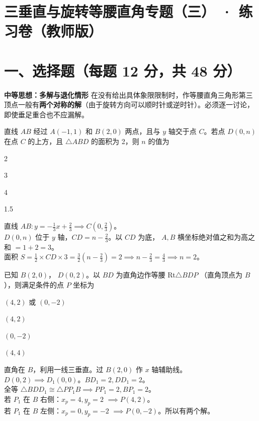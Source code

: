 \documentclass{exam-zh}
\begin{document}
\section*{三垂直与旋转等腰直角专题（三） · 练习卷（教师版）}

\section*{一、选择题（每题 12 分，共 48 分）}


\begin{keyideabox}
  \textbf{中等思想：多解与退化情形}
  在没有给出具体象限限制时，作等腰直角三角形第三顶点一般有\textbf{两个对称的解}（由于旋转方向可以顺时针或逆时针）。必须逐一讨论，即使垂足重合也不应漏解。
\end{keyideabox}



\begin{question}[points=12]
  直线 $AB$ 经过 $A(-1, 1)$ 和 $B(2, 0)$ 两点，且与 $y$ 轴交于点 $C$。若点 $D(0, n)$ 在点 $C$ 的上方，且 $\triangle ABD$ 的面积为 2，则 $n$ 的值为
  \begin{choices}
    \item 2
    \item 3
    \item 4
    \item 1.5
  \end{choices}
  \paren[A]
  \begin{solutionblock}
    直线 $AB: y = -\frac{1}{3}x + \frac{2}{3} \implies C(0, \frac{2}{3})$。\\ $D(0,n)$ 位于 $y$ 轴，$CD = n - \frac{2}{3}$。以 $CD$ 为底， $A, B$ 横坐标绝对值之和为高之和 $= 1+2=3$。\\ 面积 $S = \frac{1}{2} \times CD \times 3 = \frac{3}{2}(n-\frac{2}{3}) = 2 \implies n-\frac{2}{3} = \frac{4}{3} \implies n=2$。
  \end{solutionblock}
\end{question}



\begin{question}[points=12]
  已知 $B(2, 0)$， $D(0, 2)$。以 $BD$ 为直角边作等腰 Rt$\triangle BDP$ （直角顶点为 $B$），则满足条件的点 $P$ 坐标为
  \begin{choices}
    \item $(4, 2)$ 或 $(0, -2)$
    \item $(4, 2)$
    \item $(0, -2)$
    \item $(4, 4)$
  \end{choices}
  \paren[A]
  \begin{solutionblock}
    直角在 $B$，利用一线三垂直。过 $B(2,0)$ 作 $x$ 轴辅助线。$D(0,2) \implies D_1(0,0)$。$BD_1 = 2, DD_1=2$。\\ 全等 $\triangle BDD_1 \cong \triangle PP_1B \implies PP_1 = 2, BP_1=2$。\\ 若 $P_1$ 在 $B$ 右侧：$x_p = 4, y_p = 2$ $\implies P(4, 2)$。\\ 若 $P_1$ 在 $B$ 左侧：$x_p = 0, y_p = -2$ $\implies P(0, -2)$。所以有两个解。
  \end{solutionblock}
\end{question}
\end{document}
